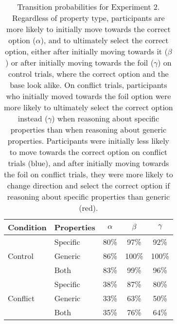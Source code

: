 \begin{table}
  \centering
  \begin{tabular}{llccc}
    \toprule
    Condition                    & Properties & $\alpha$             & $\beta$ & $\gamma$\\
    \midrule
    \multirow{3}{*}{Control}     & Specific   & 80\%                 & 97\%    & 92\%\\
                                 & Generic    & 86\%                 & 100\%   & 100\%\\
    \cmidrule(lr){2-5}
                                 & Both       & 83\%                 & 99\%    & 96\%\\
    \midrule
    \multirow{3}{*}{Conflict}    & Specific   & 38\%                 & 87\%    & 80\%\\
                                 & Generic    & 33\%                 & 63\%    & 50\%\\
    \cmidrule(lr){2-5}
                                 & Both       & 35\%                 & 76\%    & 64\%\\
    \bottomrule
  \end{tabular}
  \caption[Transition probabilities for Experiment 2.]{
    Transition probabilities for Experiment 2.
    Regardless of property type, participants are more likely
    to initially move towards the correct option ($\alpha$),
    and to ultimately select the correct option,
    either after initially moving towards it ($\beta$)
    or after initially moving towards the foil ($\gamma$)
    on control trials, where the correct option and the base look alike.
    On conflict trials, participants who initially moved towards the foil option
    were more likely to ultimately select the correct option instead ($\gamma$)
    when reasoning about specific properties than
    when reasoning about generic properties.
    Participants were initially less likely to move
    towards the correct option on conflict trials (blue),
    and after initially moving towards the foil on conflict trials,
    they were more likely to change direction and select the correct option
    if reasoning about specific properties than generic (red).
  }\label{tbl:exp2_transitions_table}
\end{table}


